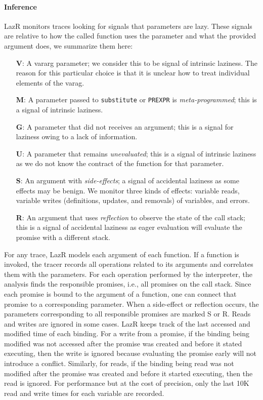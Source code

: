 \documentclass[review,creen,acmsmall]{acmart}
\renewcommand{\c}[1]{\lstinline |#1|\xspace}
\newcommand{\lazr}{{\sf LazR}\xspace}
\begin{document}
\paragraph{Inference}
\lazr monitors traces looking for signals that parameters are lazy. These
signals are relative to how the called function uses the parameter and what the
provided argument does, we summarize them here:
\begin{itemize}
\item[{\bf V}:] A vararg parameter; we consider this to be signal of intrinsic
  laziness. The reason for this particular choice is that it is unclear how to
  treat individual elements of the varag.
\item[{\bf M}:] A parameter passed to \c{substitute} or \c{PREXPR} is
  \emph{meta-programmed}; this is a signal of intrinsic laziness.
\item[{\bf G}:] A parameter that did not receives an argument; this is a
  signal for laziness owing to a lack of information.
\item[{\bf U}:] A parameter that remains \emph{unevaluated}; this is a
  signal of intrinsic laziness as we do not know the contract of the function
  for that parameter.
\item [{\bf S}:] An argument with \emph{side-effects}; a signal of
  accidental laziness as some effects may be benign. We monitor three kinds of
  effects: variable reads, variable writes (definitions, updates, and removals)
  of variables, and errors.
\item[{\bf R}:] An argument that uses \emph{reflection} to observe the state of
  the call stack; this is a signal of accidental laziness as eager evaluation
  will evaluate the promise with a different stack.
\end{itemize}

For any trace, \lazr models each argument of each function. If a function is
invoked, the tracer records all operations related to its arguments and
correlates them with the parameters. For each operation performed by the
interpreter, the analysis finds the responsible promises, i.e., all promises on
the call stack. Since each promise is bound to the argument of a function, one
can connect that promise to a corresponding parameter. When a side-effect or
reflection occurs, the parameters corresponding to all responsible promises are
marked S or R. Reads and writes are ignored in some cases. \lazr keeps track of
the last accessed and modified time of each binding. For a write from a promise,
if the binding being modified was not accessed after the promise was created and
before it stated executing, then the write is ignored because evaluating the
promise early will not introduce a conflict. Similarly, for reads, if the
binding being read was not modified after the promise was created and before it
started executing, then the read is ignored. For performance but at the cost of
precision, only the last 10K read and write times for each variable are
recorded.
\end{document}
